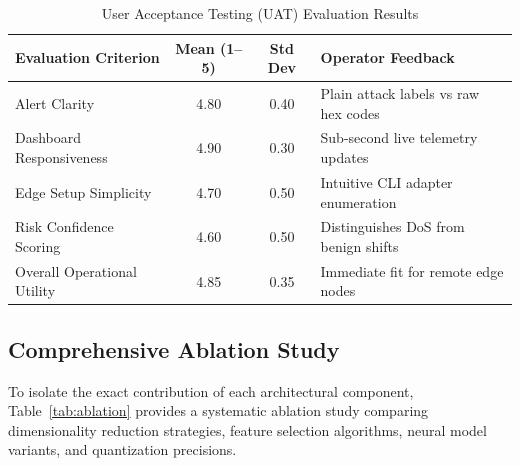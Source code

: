 \documentclass[conference]{IEEEtran}
\begin{document}
\begin{table}[htbp]
\caption{User Acceptance Testing (UAT) Evaluation Results}
\label{tab:uat}
\centering
\begin{tabularx}{\columnwidth}{lccl}
\toprule
\textbf{Evaluation Criterion} & \textbf{Mean (1--5)} & \textbf{Std Dev} & \textbf{Operator Feedback} \\
\midrule
Alert Clarity & 4.80 & 0.40 & Plain attack labels vs raw hex codes \\
Dashboard Responsiveness & 4.90 & 0.30 & Sub-second live telemetry updates \\
Edge Setup Simplicity & 4.70 & 0.50 & Intuitive CLI adapter enumeration \\
Risk Confidence Scoring & 4.60 & 0.50 & Distinguishes DoS from benign shifts \\
Overall Operational Utility & 4.85 & 0.35 & Immediate fit for remote edge nodes \\
\bottomrule
\end{tabularx}
\end{table}

\subsection{Comprehensive Ablation Study}
To isolate the exact contribution of each architectural component, Table~\ref{tab:ablation} provides a systematic ablation study comparing dimensionality reduction strategies, feature selection algorithms, neural model variants, and quantization precisions.
\end{document}
